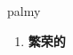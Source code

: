 
\begin{frame}
{\huge palmy}
\begin{center}
\begin{enumerate}\Large
  \item \textbf{繁荣的}
\end{enumerate}
\end{center}
\end{frame}
